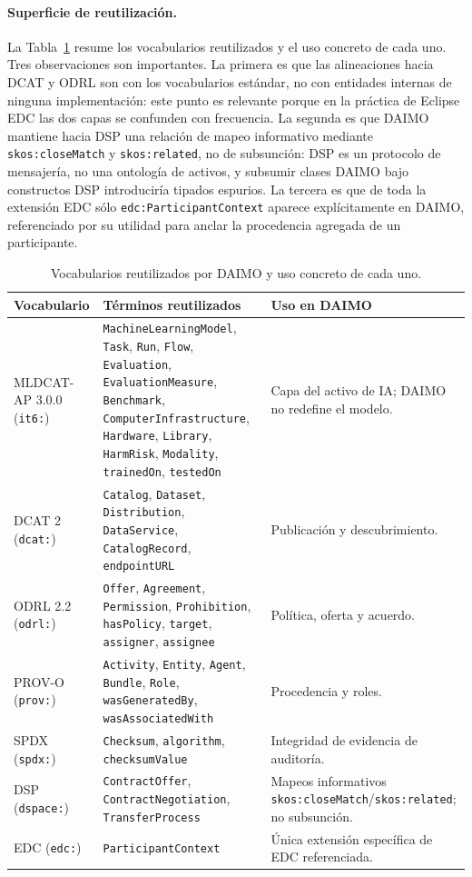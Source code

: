 \documentclass[11pt,a4paper]{article}
\newcommand{\code}[1]{\texttt{#1}}
\begin{document}
\paragraph{Superficie de reutilización.}\label{sec:reuse}

La Tabla~\ref{tab:reuse} resume los vocabularios reutilizados y el uso concreto de cada uno. Tres observaciones son importantes. La primera es que las alineaciones hacia DCAT y ODRL son con los vocabularios estándar, no con entidades internas de ninguna implementación: este punto es relevante porque en la práctica de Eclipse EDC las dos capas se confunden con frecuencia. La segunda es que DAIMO mantiene hacia DSP una relación de mapeo informativo mediante \code{skos:closeMatch} y \code{skos:related}, no de subsunción: DSP es un protocolo de mensajería, no una ontología de activos, y subsumir clases DAIMO bajo constructos DSP introduciría tipados espurios. La tercera es que de toda la extensión EDC sólo \code{edc:ParticipantContext} aparece explícitamente en DAIMO, referenciado por su utilidad para anclar la procedencia agregada de un participante.

\begin{table}[t]
\small\sf\centering
\caption{Vocabularios reutilizados por DAIMO y uso concreto de cada uno.\label{tab:reuse}}
\begin{tabular}{@{}p{2.6cm}p{5cm}p{7cm}@{}}
\toprule
\textbf{Vocabulario} & \textbf{Términos reutilizados} & \textbf{Uso en DAIMO} \\
\midrule
MLDCAT-AP 3.0.0 (\code{it6:}) & \code{MachineLearningModel}, \code{Task}, \code{Run}, \code{Flow}, \code{Evaluation}, \code{EvaluationMeasure}, \code{Benchmark}, \code{ComputerInfrastructure}, \code{Hardware}, \code{Library}, \code{HarmRisk}, \code{Modality}, \code{trainedOn}, \code{testedOn} & Capa del activo de IA; DAIMO no redefine el modelo. \\
DCAT 2 (\code{dcat:}) & \code{Catalog}, \code{Dataset}, \code{Distribution}, \code{DataService}, \code{CatalogRecord}, \code{endpointURL} & Publicación y descubrimiento. \\
ODRL 2.2 (\code{odrl:}) & \code{Offer}, \code{Agreement}, \code{Permission}, \code{Prohibition}, \code{hasPolicy}, \code{target}, \code{assigner}, \code{assignee} & Política, oferta y acuerdo. \\
PROV-O (\code{prov:}) & \code{Activity}, \code{Entity}, \code{Agent}, \code{Bundle}, \code{Role}, \code{wasGeneratedBy}, \code{wasAssociatedWith} & Procedencia y roles. \\
SPDX (\code{spdx:}) & \code{Checksum}, \code{algorithm}, \code{checksumValue} & Integridad de evidencia de auditoría. \\
DSP (\code{dspace:}) & \code{ContractOffer}, \code{ContractNegotiation}, \code{TransferProcess} & Mapeos informativos \code{skos:closeMatch}/\code{skos:related}; no subsunción. \\
EDC (\code{edc:}) & \code{ParticipantContext} & Única extensión específica de EDC referenciada. \\
\bottomrule
\end{tabular}
\end{table}
\end{document}
